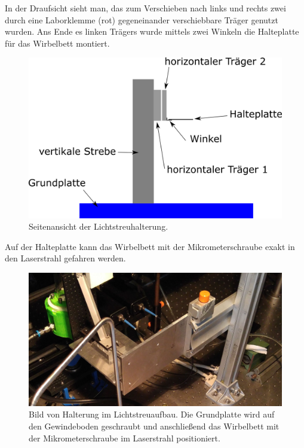 In der Draufsicht sieht man, das zum Verschieben nach links und rechts zwei durch eine Laborklemme (rot) gegeneinander verschiebbare Träger genutzt wurden. Ans Ende es linken Trägers wurde mittels zwei Winkeln die Halteplatte für das Wirbelbett montiert.

\newpage

\begin{figure}[h!]
		\centering
		\includegraphics[scale=0.7]{Halterung_Lichtstreu_Seite.png}
		\caption[Haltearm Lichtstreuaufbau Seitenansicht]{Seitenansicht der Lichtstreuhalterung.}
\end{figure}

 Auf der Halteplatte kann das Wirbelbett mit der Mikrometerschraube exakt in den Laserstrahl gefahren werden.

\begin{figure}[h!]
	\centering
	\includegraphics[scale=0.16]{Lichtstreuaufbau.jpg}
	\caption[Aufbau in Lichtstreuaufbau]{Bild von Halterung im Lichtstreuaufbau. Die Grundplatte wird auf den Gewindeboden geschraubt und anschließend das Wirbelbett mit der Mikrometerschraube im Laserstrahl positioniert.}
\end{figure}

